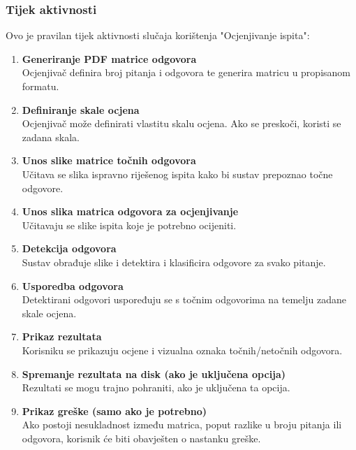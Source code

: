 \documentclass{foi}
\begin{document}
\subsubsection{Tijek aktivnosti}
\begin{flushleft}
Ovo je pravilan tijek aktivnosti slučaja korištenja "Ocjenjivanje ispita":
\begin{enumerate}
    \item \textbf{Generiranje PDF matrice odgovora} \\
    Ocjenjivač definira broj pitanja i odgovora te generira matricu u propisanom formatu.
    
    \item \textbf{Definiranje skale ocjena} \\
    Ocjenjivač može definirati vlastitu skalu ocjena. Ako se preskoči, koristi se zadana skala.
    
    \item \textbf{Unos slike matrice točnih odgovora} \\
    Učitava se slika ispravno riješenog ispita kako bi sustav prepoznao točne odgovore.
    
    \item \textbf{Unos slika matrica odgovora za ocjenjivanje} \\
    Učitavaju se slike ispita koje je potrebno ocijeniti.
    
    \item \textbf{Detekcija odgovora} \\
    Sustav obrađuje slike i detektira i klasificira odgovore za svako pitanje.
    
    \item \textbf{Usporedba odgovora} \\
    Detektirani odgovori uspoređuju se s točnim odgovorima na temelju zadane skale ocjena.
    
    \item \textbf{Prikaz rezultata} \\
    Korisniku se prikazuju ocjene i vizualna oznaka točnih/netočnih odgovora.
    
    \item \textbf{Spremanje rezultata na disk (ako je uključena opcija)} \\
    Rezultati se mogu trajno pohraniti, ako je uključena ta opcija.
    
    \item \textbf{Prikaz greške (samo ako je potrebno)} \\
    Ako postoji nesukladnost između matrica, poput razlike u broju pitanja ili odgovora, korisnik će biti obavješten o nastanku greške.
\end{enumerate}
\end{flushleft}
\end{document}
